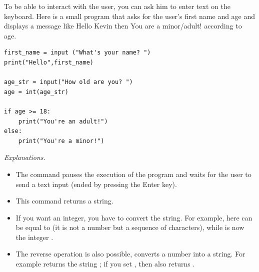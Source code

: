 \documentclass[11pt,class=report,crop=false]{standalone}
\begin{document}
\begin{cours}


To be able to interact with the user, you can ask him to enter text on the keyboard.
Here is a small program that asks for the user's first name and age and displays a message like \og{}Hello Kevin\fg{} then \og{}You are a minor/adult!\fg{} according to age.

\begin{center}
\begin{minipage}{0.6\textwidth}
\begin{lstlisting}
first_name = input ("What's your name? ")
print("Hello",first_name)

age_str = input("How old are you? ")
age = int(age_str)

if age >= 18:
    print("You're an adult!")
else:
    print("You're a minor!")
\end{lstlisting}
\end{minipage} 
\end{center} 

\emph{Explanations.}
\begin{itemize}
  \item The command 
  pauses the execution of the program and waits for the user to send a text input (ended by pressing the \og{}Enter\fg{} key).
  
  \item This command returns a string.
  
  \item {} If you want an integer, you have to convert the string. For example, here  can be equal to
   (it is not a number but a sequence of characters), while  is now the integer . 
  
  \item {} The reverse operation is also possible,  converts a number into a string. For example  returns the string ; if you set , then  also returns .
\end{itemize}

\end{cours}

\end{document}
